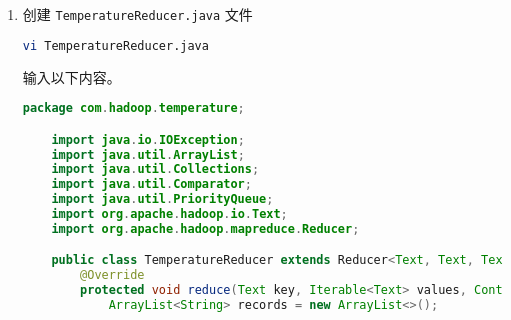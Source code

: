 \documentclass{article}
\newenvironment{enum}{
    \begin{enumerate}[label=(\arabic*), noitemsep]
}{
    \end{enumerate}
}
\begin{document}
\begin{enum}
    \begin{lstlisting}[language=java]
    package com.hadoop.temperature;

    import java.io.IOException;
    import org.apache.hadoop.io.Text;
    import org.apache.hadoop.mapreduce.Mapper;

    public class TemperatureMapper extends Mapper<Object, Text, Text, Text> {
        @Override
        protected void map(Object key, Text value, Context context) throws IOException, InterruptedException {
            String line = value.toString();
            String[] parts = line.split("\\s+");
            if (parts.length == 3) {
                String date = parts[0];
                String time = parts[1];
                String temperature = parts[2];

                String yearMonth = date.substring(0, 7);
                String fullRecord = date + " " + time + " " + temperature;

                Text outputKey = new Text();
                Text outputValue = new Text();

                outputKey.set(yearMonth);
                outputValue.set(fullRecord);

                context.write(outputKey, outputValue);
            }
        }
    }
    \end{lstlisting}
    
    \item 创建 \texttt{TemperatureReducer.java} 文件
    
    \begin{lstlisting}[language=bash]
    vi TemperatureReducer.java
    \end{lstlisting}
    
    输入以下内容。
    
    \begin{lstlisting}[language=java]
    package com.hadoop.temperature;

    import java.io.IOException;
    import java.util.ArrayList;
    import java.util.Collections;
    import java.util.Comparator;
    import java.util.PriorityQueue;
    import org.apache.hadoop.io.Text;
    import org.apache.hadoop.mapreduce.Reducer;

    public class TemperatureReducer extends Reducer<Text, Text, Text, Text> {
        @Override
        protected void reduce(Text key, Iterable<Text> values, Context context) throws IOException, InterruptedException {
            ArrayList<String> records = new ArrayList<>();


\end{lstlisting}
\end{enum}
\end{document}
